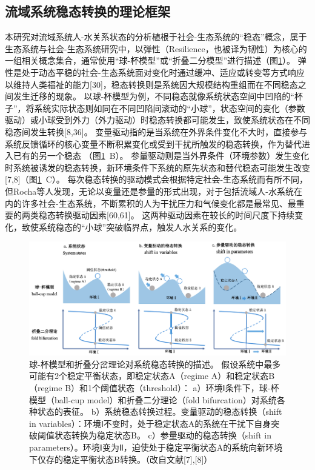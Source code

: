 \subsection{流域系统稳态转换的理论框架}

本研究对流域系统人-水关系状态的分析植根于社会-生态系统的“稳态”概念，属于生态系统与社会-生态系统研究中，以弹性（Resilience，也被译为韧性）为核心的一组相关概念集合，通常使用“球-杯模型”或“折叠二分模型”进行描述（图\ref{ch2:fig:regime_shift}）。
弹性是处于动态平稳的社会-生态系统面对变化时通过缓冲、适应或转变等方式响应以维持人类福祉的能力[30]，稳态转换则是系统因大规模结构重组而在不同稳态之间发生迁移的现象。
以球-杯模型为例，不同稳态就像系统状态空间中凹陷的“杯子”，将系统实际状态则如同在不同凹陷间滚动的“小球”，状态空间的变化（参数驱动）或小球受到外力（外力驱动）时稳态转换都可能发生，致使系统状态在不同稳态间发生转换[8,36]。
变量驱动指的是当系统在外界条件变化不大时，直接参与系统反馈循环的核心变量不断积累变化或受到干扰所触发的稳态转换，作为替代进入已有的另一个稳态 （图\ref{ch2:fig:regime_shift}~B）。
参量驱动则是当外界条件（环境参数）发生变化时系统被诱发的稳态转换，新环境条件下系统的原先状态和替代稳态可能发生改变[7,8]（图\ref{ch2:fig:regime_shift}~C）。
每次稳态转换的驱动模式会根据特定社会-生态系统而有所不同，但Rocha等人发现，无论以变量还是参量的形式出现，对于包括流域人-水系统在内的许多社会-生态系统，不断累积的人为干扰压力和气候变化都是最常见、最重要的两类稳态转换驱动因素[60,61]。
这两种驱动因素在较长的时间尺度下持续变化，致使系统稳态的“小球”突破临界点，触发人水关系的变化。

\begin{figure}[htb] %
    \centering
    \includegraphics[width=\textwidth]{img/ch2/ch2_regime_shift.png}
    \caption[球-杯模型和折叠分岔理论对系统稳态转换的描述]{球-杯模型和折叠分岔理论对系统稳态转换的描述。
    假设系统中最多可能有2个稳定平衡状态，即稳定状态A（regime A）和稳定状态B（regime B）和1个阈值状态（threshold）：
    a）环境Ⅰ条件下，球-杯模型（ball-cup model）和折叠二分理论（fold bifurcation）对系统各种状态的表征。
    b）系统稳态转换过程。变量驱动的稳态转换（shift in variables）：环境Ⅰ不变时，处于稳定状态A的系统在干扰下自身突破阈值状态转换为稳定状态B。
    c）参量驱动的稳态转换（shift in parameters）。环境Ⅰ变为Ⅱ，迫使处于稳定平衡状态A的系统向新环境下仅存的稳定平衡状态B转换。（改自文献[7],[8]）}
    \label{ch2:fig:regime_shift}
\end{figure}

